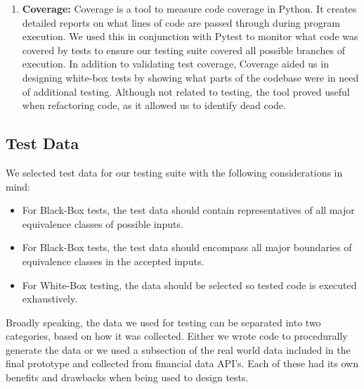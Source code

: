 \documentclass[main.tex]{subfiles}
\begin{document}
\begin{enumerate}
\item \textbf{Coverage:}
Coverage\cite{coverage} is a tool to measure code coverage in Python. It creates detailed reports on what lines of code are passed through during program execution. We used this in conjunction with Pytest to monitor what code was covered by tests to ensure our testing suite covered all possible branches of execution. In addition to validating test coverage, Coverage aided us in designing white-box tests by showing what parts of the codebase were in need of additional testing. Although not related to testing, the tool proved useful when refactoring code, as it allowed us to identify dead code.

\end{enumerate}


\subsection{Test Data}

We selected test data for our testing suite with the following considerations in mind:

\begin{itemize}

\item For Black-Box tests, the test data should contain representatives of all major equivalence classes of possible inputs.
\item For Black-Box tests, the test data should encompass all major boundaries of equivalence classes in the accepted inputs.
\item For White-Box testing, the data should be selected so tested code is executed exhaustively.

\end{itemize}

Broadly speaking, the data we used for testing can be separated into two categories, based on how it was collected. Either we wrote code to procedurally generate the data or we used a subsection of the real world data included in the final prototype and collected from financial data API’s. Each of these had its own benefits and drawbacks when being used to design tests.
\end{document}
